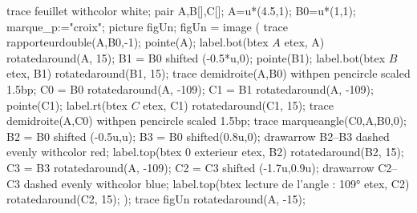 \begin{changemargin}{0mm}{-20mm}
\begin{methode*2*2}
        \begin{Geometrie}[CoinHD={(8.5u,5u)}]
            trace feuillet withcolor white;
            pair A,B[],C[];
            A=u*(4.5,1);
            B0=u*(1,1);
            marque_p:="croix";
            picture figUn;
            figUn = image (
                trace rapporteurdouble(A,B0,-1);
                pointe(A);
                label.bot(btex $A$ etex, A) rotatedaround(A, 15);
                B1 = B0 shifted (-0.5*u,0);
                pointe(B1);
                label.bot(btex $B$ etex, B1)  rotatedaround(B1, 15);
                trace demidroite(A,B0) withpen pencircle scaled 1.5bp;
                C0 = B0 rotatedaround(A, -109);
                C1 = B1 rotatedaround(A, -109);
                pointe(C1);
                label.rt(btex $C$ etex, C1)  rotatedaround(C1, 15);
                trace demidroite(A,C0) withpen pencircle scaled 1.5bp;
                trace marqueangle(C0,A,B0,0);
                B2 = B0 shifted (-0.5u,u);
                B3 = B0 shifted(0.8u,0);
                drawarrow B2--B3 dashed evenly withcolor red;
                label.top(btex {\red $0$ exterieur} etex, B2) rotatedaround(B2, 15);
                C3 = B3 rotatedaround(A, -109);
                C2 = C3 shifted (-1.7u,0.9u);
                drawarrow C2--C3 dashed evenly withcolor blue;
                label.top(btex {\blue lecture de l'angle : \ang{109}} etex, C2) rotatedaround(C2, 15);
            );
            trace figUn rotatedaround(A, -15);
        \end{Geometrie}
    \end{methode*2*2}
\end{changemargin}

